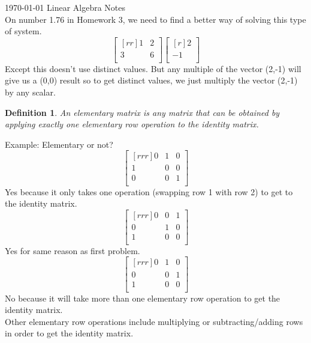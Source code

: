 \documentclass[12pt]{article}
\newtheorem{defn}{Definition}[section]
\begin{document}
\TabPositions{4cm}
 
\today {} Linear Algebra Notes\\

On number 1.76 in Homework 3, we need to find a better way of solving this type of system.
\[
\begin{bmatrix}[rr] 1 & 2\\ 3 & 6\\ \end{bmatrix}
\begin{bmatrix}[r] 2\\ -1\\ \end{bmatrix}
\]
Except this doesn't use distinct values. But any multiple of the vector (2,-1) will give us a (0,0) result so to get distinct values, we just multiply the vector (2,-1) by any scalar.\\

\begin{defn} An elementary matrix is any matrix that can be obtained by applying exactly one elementary row operation to the identity matrix. \end{defn}

Example: Elementary or not?\\
\[
\begin{bmatrix}[rrr] 0 & 1 & 0\\ 1 & 0 & 0\\ 0 & 0 & 1\\ \end{bmatrix}
\]
Yes because it only takes one operation (swapping row 1 with row 2) to get to the identity matrix.
\[
\begin{bmatrix}[rrr] 0 & 0 & 1\\ 0 & 1 & 0\\ 1 & 0 & 0\\ \end{bmatrix}
\]
Yes for same reason as first problem.
\[ 
\begin{bmatrix}[rrr] 0 & 1 & 0\\ 0 & 0 & 1\\ 1 & 0 & 0\\ \end{bmatrix}
\]
No because it will take more than one elementary row operation to get the identity matrix.\\
Other elementary row operations include multiplying or subtracting/adding rows in order to get the identity matrix.\\
\end{document}

